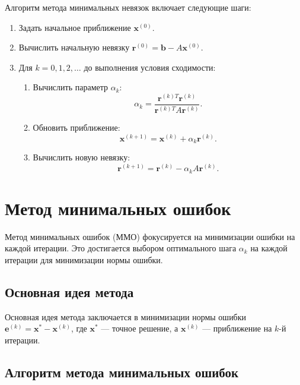 \documentclass{article}
\begin{document}
Алгоритм метода минимальных невязок включает следующие шаги:
\begin{enumerate}
    \item Задать начальное приближение \(\mathbf{x}^{(0)}\).
    \item Вычислить начальную невязку \(\mathbf{r}^{(0)} = \mathbf{b} - A\mathbf{x}^{(0)}\).
    \item Для \(k = 0, 1, 2, \ldots\) до выполнения условия сходимости:
    \begin{enumerate}
        \item Вычислить параметр \(\alpha_k\):
        \[
        \alpha_k = \frac{\mathbf{r}^{(k)T} \mathbf{r}^{(k)}}{\mathbf{r}^{(k)T} A \mathbf{r}^{(k)}}.
        \]
        \item Обновить приближение:
        \[
        \mathbf{x}^{(k+1)} = \mathbf{x}^{(k)} + \alpha_k \mathbf{r}^{(k)}.
        \]
        \item Вычислить новую невязку:
        \[
        \mathbf{r}^{(k+1)} = \mathbf{r}^{(k)} - \alpha_k A \mathbf{r}^{(k)}.
        \]
    \end{enumerate}
\end{enumerate}
\section{Метод минимальных ошибок}
Метод минимальных ошибок (ММО) фокусируется на минимизации ошибки на каждой итерации. Это достигается выбором оптимального шага $\alpha_k$ на каждой итерации для минимизации нормы ошибки.

\subsection*{Основная идея метода}

Основная идея метода заключается в минимизации нормы ошибки \(\mathbf{e}^{(k)} = \mathbf{x}^{*} - \mathbf{x}^{(k)}\), где \(\mathbf{x}^{*}\) — точное решение, а \(\mathbf{x}^{(k)}\) — приближение на \(k\)-й итерации.

\subsection*{Алгоритм метода минимальных ошибок}
\end{document}
